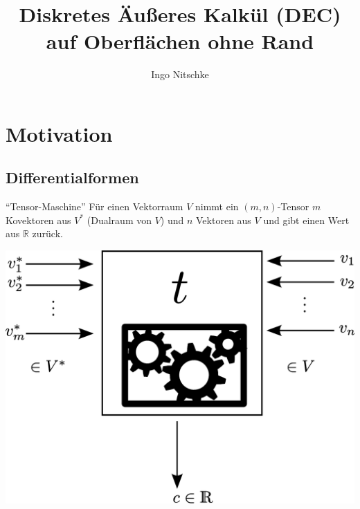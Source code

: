 \documentclass[handout]{beamer}
\title[DEC]{Diskretes Äußeres Kalkül (DEC)\\auf Oberflächen ohne Rand}
\author{Ingo Nitschke}
\institute{IWR - TU Dresden}
\newcommand{\R}{\mathds{R}}
\begin{document}
 \frame{ \titlepage }

  
\section{Motivation}

  \subsection{Differentialformen}
  \begin{frame}
    \begin{block}{"`Tensor-Maschine"'}
      Für einen Vektorraum \( V \) nimmt ein \( (m,n) \)-Tensor \( m \) Kovektoren aus \( V^{*} \)
      (Dualraum von \( V \)) und \( n \) Vektoren aus \( V \) und gibt einen Wert aus \( \R \) zurück.

      \centering\includegraphics[height=0.7\textheight]{bilder/tensormaschine/Tensor.eps}
    \end{block}
  \end{frame}
\end{document}
